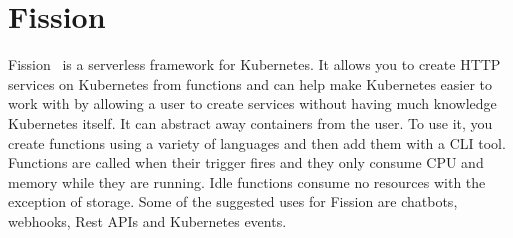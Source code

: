 \section{Fission}
Fission~\cite{hid-sp18-521-FissionBlog} is a serverless framework for
Kubernetes. It allows you to create HTTP services on Kubernetes from
functions and can help make Kubernetes easier to work with by
allowing a user to create services without having much knowledge
Kubernetes itself. It can abstract away containers from the user. 
To use it, you create functions using a variety of languages and then
add them with a CLI tool. Functions are called when their trigger fires and 
they only consume CPU and memory while they are running. Idle functions 
consume no resources with the exception of storage. Some of the suggested
uses for Fission are chatbots, webhooks, Rest APIs and Kubernetes events.
